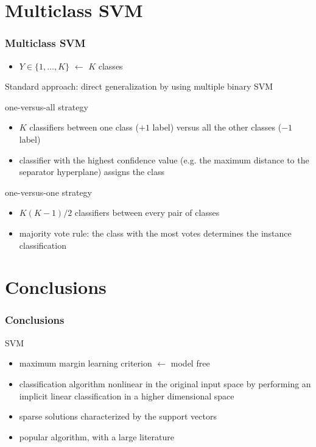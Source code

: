 \documentclass[compress, smaller, serif, 9pt]{beamer}
\newcommand{\structuretext}[1]{{\usebeamercolor[fg]{structure} #1}}
\newcommand{\doigt}{\structuretext{\noindent \Pisymbol{pzd}{43}}}
\begin{document}
\section{Multiclass SVM}
\begin{frame}
  \frametitle{Multiclass SVM}
  \begin{itemize}
   \item $Y \in \{1,\ldots,K\}$ $\leftarrow$ $K$ classes
  \end{itemize}
   Standard approach: direct generalization by using multiple binary SVM
   \begin{block}{one-versus-all strategy}
    \begin{itemize}
    \item $K$ classifiers between one class ($+1$ label) versus all the other classes ($-1$ label)
    \item[\doigt]  classifier with the highest confidence value (e.g. the maximum distance to the separator hyperplane) assigns the class
    \end{itemize}
   \end{block}
   
   
    \begin{block}{one-versus-one strategy}
    \begin{itemize}
    \item $K(K-1)/2$ classifiers between every pair of classes
    \item[\doigt] majority vote rule: the class with the most votes determines the instance classification
    \end{itemize}
   \end{block}
  

  \end{frame}
  
  
  \section{Conclusions}
  \begin{frame}
  \frametitle{Conclusions}
  \begin{block}{SVM}
  \begin{itemize}
   \item maximum margin learning criterion $\leftarrow$ model free
   \item classification algorithm nonlinear in the original input space by performing an implicit linear classification
   in a higher dimensional space
   \item sparse solutions characterized by the support vectors
   \item popular algorithm, with a large literature 
    \end{itemize}
\end{block}

  

  \end{frame}

  
  
\end{document}
